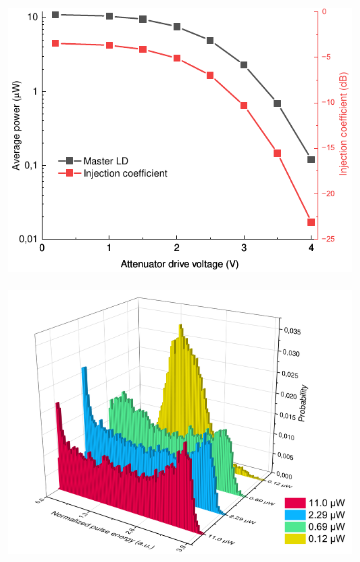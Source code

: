 \begin{figure}
\begin{subfigure}{0.49\linewidth}
	\centering
	\includegraphics[width=\textwidth]{images/master_power.pdf}
	\caption{}
\end{subfigure}
\hfill
\begin{subfigure}{0.49\linewidth}
	\centering
	\includegraphics[width=\textwidth]{images/hist_initial.pdf}
	\caption{}
\end{subfigure}
\begin{subfigure}{0.49\linewidth}
	\centering

\end{subfigure}
\end{figure}
